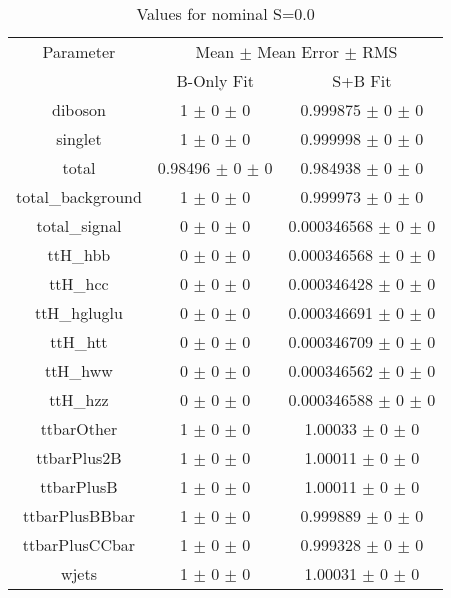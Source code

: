 \begin{table}
\centering
\caption{Values for nominal S=0.0}
\begin{tabular}{ccc}
\toprule
Parameter 	& \multicolumn{2}{c}{Mean $\pm$ Mean Error $\pm$ RMS}\\
 	& B-Only Fit & S+B Fit\\
\midrule
diboson 	& \num{1} $\pm$ \num{0} $\pm$ \num{0} 	& \num{0.999875} $\pm$ \num{0} $\pm$ \num{0}\\
singlet 	& \num{1} $\pm$ \num{0} $\pm$ \num{0} 	& \num{0.999998} $\pm$ \num{0} $\pm$ \num{0}\\
total 	& \num{0.98496} $\pm$ \num{0} $\pm$ \num{0} 	& \num{0.984938} $\pm$ \num{0} $\pm$ \num{0}\\
total\_background 	& \num{1} $\pm$ \num{0} $\pm$ \num{0} 	& \num{0.999973} $\pm$ \num{0} $\pm$ \num{0}\\
total\_signal 	& \num{0} $\pm$ \num{0} $\pm$ \num{0} 	& \num{0.000346568} $\pm$ \num{0} $\pm$ \num{0}\\
ttH\_hbb 	& \num{0} $\pm$ \num{0} $\pm$ \num{0} 	& \num{0.000346568} $\pm$ \num{0} $\pm$ \num{0}\\
ttH\_hcc 	& \num{0} $\pm$ \num{0} $\pm$ \num{0} 	& \num{0.000346428} $\pm$ \num{0} $\pm$ \num{0}\\
ttH\_hgluglu 	& \num{0} $\pm$ \num{0} $\pm$ \num{0} 	& \num{0.000346691} $\pm$ \num{0} $\pm$ \num{0}\\
ttH\_htt 	& \num{0} $\pm$ \num{0} $\pm$ \num{0} 	& \num{0.000346709} $\pm$ \num{0} $\pm$ \num{0}\\
ttH\_hww 	& \num{0} $\pm$ \num{0} $\pm$ \num{0} 	& \num{0.000346562} $\pm$ \num{0} $\pm$ \num{0}\\
ttH\_hzz 	& \num{0} $\pm$ \num{0} $\pm$ \num{0} 	& \num{0.000346588} $\pm$ \num{0} $\pm$ \num{0}\\
ttbarOther 	& \num{1} $\pm$ \num{0} $\pm$ \num{0} 	& \num{1.00033} $\pm$ \num{0} $\pm$ \num{0}\\
ttbarPlus2B 	& \num{1} $\pm$ \num{0} $\pm$ \num{0} 	& \num{1.00011} $\pm$ \num{0} $\pm$ \num{0}\\
ttbarPlusB 	& \num{1} $\pm$ \num{0} $\pm$ \num{0} 	& \num{1.00011} $\pm$ \num{0} $\pm$ \num{0}\\
ttbarPlusBBbar 	& \num{1} $\pm$ \num{0} $\pm$ \num{0} 	& \num{0.999889} $\pm$ \num{0} $\pm$ \num{0}\\
ttbarPlusCCbar 	& \num{1} $\pm$ \num{0} $\pm$ \num{0} 	& \num{0.999328} $\pm$ \num{0} $\pm$ \num{0}\\
wjets 	& \num{1} $\pm$ \num{0} $\pm$ \num{0} 	& \num{1.00031} $\pm$ \num{0} $\pm$ \num{0}\\
\bottomrule
\end{tabular}
\end{table}